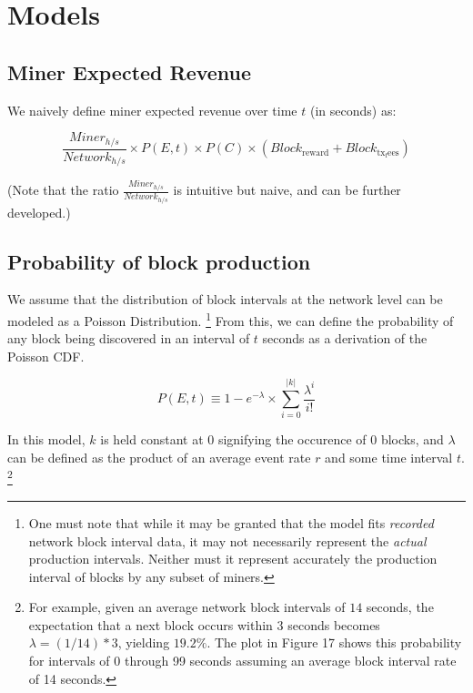 \documentclass[11pt]{article}
\theoremstyle{plain}
\begin{document}
\pagebreak
\section{\normalsize{Models}}



\subsection{\normalsize{Miner Expected Revenue}}

We naively define miner expected revenue over time $t$ (in seconds) as:

\newcommand{\minerHashrate}{Miner_{h/s}}
\newcommand{\networkHashrate}{Network_{h/s}}
\newcommand{\blockReward}{Block_\mathrm{reward}}
\newcommand{\blockTransactionFees}{Block_\mathrm{tx_fees}}

\begin{equation}
\frac{\minerHashrate}{\networkHashrate}
\times
P(E,t)
\times
P(C)
\times
(\blockReward + \blockTransactionFees)
\end{equation}

(Note that the ratio $\frac{\minerHashrate}{\networkHashrate}$ is intuitive but
naive, and can be further developed.)

\subsection{\normalsize{Probability of block production}}

We assume that the distribution of block intervals at the network level can be
modeled as a Poisson Distribution.\nolinebreak
\footnote{
One must note that while it may be granted that the model fits \emph{recorded}
network block interval data, it may not necessarily represent the \emph{actual}
production intervals. Neither must it represent accurately the production
interval of blocks by any subset of miners.
}
From this, we can define the probability of any block being discovered in an
interval of $t$ seconds as a derivation of the Poisson CDF.

\begin{equation}
P(E,t) \equiv 1 - e^{-\lambda} \times \sum_{i=0}^{|k|}{\frac{\lambda^{i}}{i!}} 
\end{equation}

In this model, $k$ is held constant at $0$ signifying the occurence of 0
blocks, and $\lambda$ can be defined as the product of an average event rate
$r$ and some time interval $t$.\nolinebreak
\footnote{
For example, given an average network block intervals of $14$ seconds, the
expectation that a next block occurs within $3$ seconds becomes $\lambda =
(1/14) * 3$, yielding $19.2\%$.
The plot in Figure 17 shows this probability for intervals of 0 through 99
seconds assuming an average block interval rate of 14 seconds.
}
\end{document}

